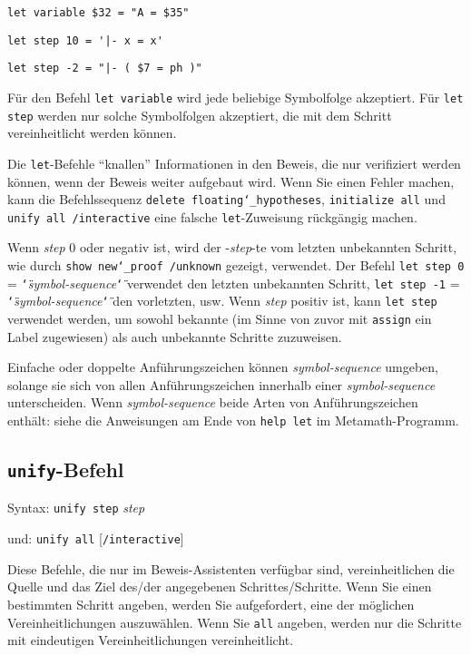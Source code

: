     \verb/let variable $32 = "A = $35"/

    \verb/let step 10 = '|- x = x'/

    \verb/let step -2 = "|- ( $7 = ph )"/

Für den Befehl \texttt{let variable} wird jede beliebige Symbolfolge akzeptiert.  Für \texttt{let step} werden nur solche Symbolfolgen akzeptiert, die mit dem Schritt vereinheitlicht werden können.

Die \texttt{let}-Befehle "`knallen"' Informationen in den Beweis, die nur verifiziert werden können, wenn der Beweis weiter aufgebaut wird.  Wenn Sie einen \mbox{Fehler} machen, kann die Befehlssequenz \texttt{delete floating{\char`\_}hypotheses},
\texttt{initialize all} und \texttt{unify all /interactive} eine falsche \texttt{let}-Zuweisung rückgängig machen.

Wenn {\em step} 0 oder negativ ist, wird der -{\em step}-te vom letzten unbekannten Schritt, wie durch \texttt{show new{\char`\_}proof /unknown} gezeigt, verwendet.  Der Befehl \texttt{let step 0} = \texttt{\char`\"}{\em symbol-sequence}\texttt{\char`\"} verwendet den letzten unbekannten Schritt, \texttt{let step -1} = \texttt{\char`\"}{\em symbol-sequence}\texttt{\char`\"} den vorletzten, usw. Wenn {\em step} positiv ist, kann \texttt{let step} verwendet werden, um sowohl bekannte (im Sinne von zuvor mit \texttt{assign} ein Label zugewiesen) als auch unbekannte Schritte zuzuweisen.

Einfache oder doppelte Anführungszeichen können {\em symbol-sequence} um\-ge\-ben, solange sie sich von allen Anführungszeichen innerhalb einer {\em symbol-sequence} unterscheiden.  Wenn {\em symbol-sequence} beide Arten von Anführungs\-zeichen enthält: siehe die Anweisungen am Ende von \texttt{help let} im Metamath-Programm.


\subsection{\texttt{unify}-Befehl}

Syntax:  \texttt{unify step} {\em step}

      und:   \texttt{unify all} [\texttt{/interactive}]

Diese Befehle, die nur im Beweis-Assistenten verfügbar sind, vereinheitlichen die Quelle und das Ziel des/der angegebenen Schrittes/Schritte. Wenn Sie einen bestimmten Schritt angeben, werden Sie aufgefordert, eine der möglichen Vereinheitlichungen auszuwählen.  Wenn Sie \texttt{all} angeben, werden nur die Schritte mit eindeutigen Vereinheitlichungen vereinheitlicht.

